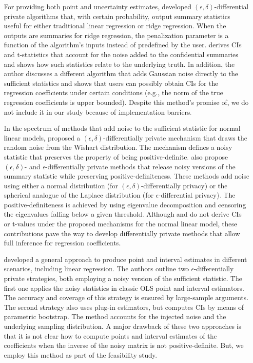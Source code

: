 For providing both point and uncertainty estimates, \citet{sheffet2017differentially} developed $(\epsilon,\delta)$-differential private algorithms that, with certain probability, output summary statistics useful for either traditional linear regression or ridge regression. When the outputs are summaries for ridge regression, the penalization parameter is a function of the algorithm's inputs instead of predefined by the user. \citet{sheffet2017differentially} derives CIs and t-statistics that account for the noise added to the confidential summaries and shows how such statistics relate to the underlying truth. In addition, the author discusses a different algorithm that adds Gaussian noise directly to the sufficient statistics and shows that users can possibly obtain CIs for the regression coefficients under certain conditions (e.g., the norm of the true regression coefficients is upper bounded). Despite this method's promise of, we do not include it in our study because of implementation barriers.

In the spectrum of methods that add noise to the sufficient statistic for normal linear models, \citet{sheffet2019old} proposed a $(\epsilon,\delta)$-differentially private mechanism that draws the random noise from the Wishart distribution. The mechanism defines a noisy statistic that preserves the property of being positive-definite. \citet{wang2019differentially} also propose $(\epsilon,\delta)$- and $\epsilon$-differentially private methods that release noisy versions of the summary statistic while preserving positive-definiteness. These methods add noise using either a normal distribution (for $(\epsilon,\delta)$-differentially privacy) or the spherical analogue of the Laplace distribution (for $\epsilon$-differential privacy). The positive-definiteness is achieved by using eigenvalue decomposition and censoring the eigenvalues falling below a given threshold. Although \citet{sheffet2019old} and \citet{wang2019differentially} do not derive CIs or t-values under the proposed mechanisms for the normal linear model, these contributions pave the way to develop differentially private methods that allow full inference for regression coefficients.  

\citet{ferrando2020general} developed a general approach to produce point and interval estimates in different scenarios, including linear regression. The authors outline two $\epsilon$-differentially private strategies, both employing a noisy version of the sufficient statistic. The first one applies the noisy statistics in classic OLS point and interval estimators. The accuracy and coverage of this strategy is ensured by large-sample arguments. The second strategy also uses plug-in estimators, but computes CIs by means of parametric bootstrap. The method accounts for the injected noise and the underlying sampling distribution. A major drawback of these two approaches is that it is not clear how to compute points and interval estimates of the coefficients when the inverse of the noisy matrix is not positive-definite. But, we employ this method as part of the feasibility study.

